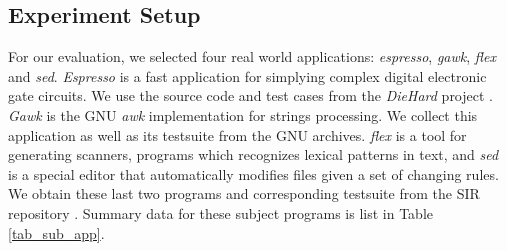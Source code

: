 \subsection{Experiment Setup}


\begin{table}[htbp]
\centering
\caption{Subject applications}
\label{tab_sub_app}
\end{table}

For our evaluation, we selected four real world applications: \emph{espresso}, \emph{gawk}, \emph{flex} and \emph{sed}. \emph{Espresso} is a fast application for simplying complex digital electronic gate circuits. We use the source code and test cases from the \emph{DieHard} project \cite{Berger:2006:DPM:1133255.1134000}. \emph{Gawk} is the GNU \emph{awk} implementation for strings processing. We collect this application as well as its testsuite from the GNU archives. \emph{flex} is a tool for generating scanners, programs which recognizes lexical patterns in text, and \emph{sed} is a special editor that automatically modifies files given a set of changing rules. We obtain these last two programs and corresponding testsuite from the SIR repository \cite{SIR2005}. Summary data for these subject programs is list in Table \ref{tab_sub_app}.
%


